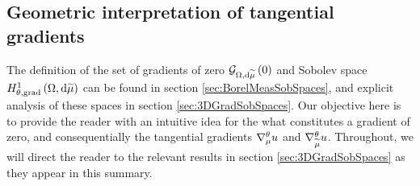\subsection{Geometric interpretation of tangential gradients} \label{ssec:3DGradGeometric}
The definition of the set of gradients of zero $\mathcal{G}_{ \Omega, \mathrm{d}\widetilde{\mu}}\left( 0 \right)$ and Sobolev space $H^1_{\theta, \mathrm{grad}}\left( \Omega, \mathrm{d}\widetilde{\mu} \right)$ can be found in section \ref{sec:BorelMeasSobSpaces}, and explicit analysis of these spaces in section \ref{sec:3DGradSobSpaces}.
Our objective here is to provide the reader with an intuitive idea for the what constitutes a gradient of zero, and consequentially the tangential gradients $\nabla^{\theta}_{\mu}u$ and $\nabla^{\theta}_{\widetilde{\mu}}u$.
Throughout, we will direct the reader to the relevant results in section \ref{sec:3DGradSobSpaces} as they appear in this summary.

